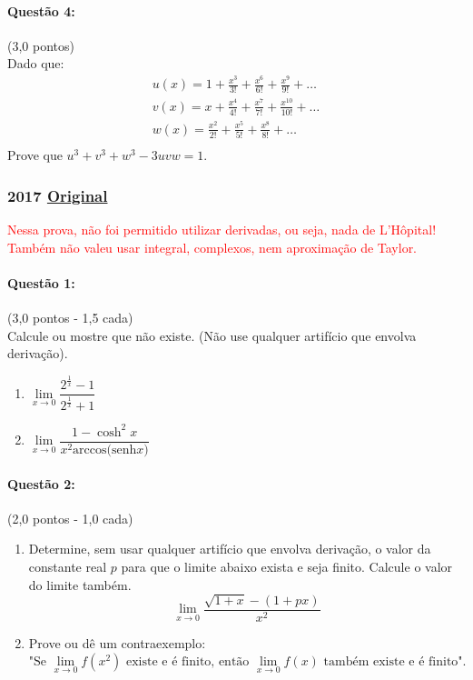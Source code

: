 \documentclass[12pt,a4paper]{article}
\newcommand{\original}[1]{\tiny \href{#1}{Original} \normalsize}
\begin{document}
\newpage

\paragraph{Questão 4:} (3,0 pontos) \\
Dado que:
\begin{align*}
u(x) = 1 + \frac{x^3}{3!} + \frac{x^6}{6!} + \frac{x^9}{9!} + \dots  \\
v(x) = x + \frac{x^4}{4!} + \frac{x^7}{7!} + \frac{x^{10}}{10!} + \dots  \\
w(x) = \frac{x^2}{2!} + \frac{x^5}{5!} + \frac{x^8}{8!} + \dots  \\
\end{align*}
Prove que $ u^3 + v^3 + w^3 - 3uvw = 1$. 

\newpage


\subsubsection{2017 \original{https://drive.google.com/file/d/1IsTA8j9YEY4dMirQQ2oATMbmVwdLysBI/view?usp=sharing}}

\textcolor{red}{Nessa prova, não foi permitido utilizar derivadas, ou seja, nada de L'Hôpital! Também não valeu usar integral, complexos, nem aproximação de Taylor.}

\paragraph{Questão 1: }(3,0 pontos - 1,5 cada) \\
Calcule ou mostre que não existe. (Não use qualquer artifício que envolva derivação).

\begin{enumerate}[label=(\alph*)]

\item $\lim\limits_{x\to 0} \dfrac{2^{\frac{1}{x}}-1}
{2^{\frac{1}{x}}+1}$

\item $\lim\limits_{x \to 0} \dfrac{1-\cosh^2 x}{x^2\mathrm{arccos(senh}x)}$

\end{enumerate}

\paragraph{Questão 2: }(2,0 pontos - 1,0 cada)
\begin{enumerate}[label=(\alph*)]
\item Determine, sem usar qualquer artifício que envolva derivação, o valor da constante real $p$ para que o limite abaixo exista e seja finito. Calcule o valor do limite também.
$$\lim\limits_{x\to 0} \dfrac{\sqrt{1+x} - (1+px)}{x^2}$$

\item Prove ou dê um contraexemplo:
$$\text{"Se }\lim\limits_{x\to 0} f(x^2) \text{ existe e é finito, então }\lim\limits_{x\to 0}f(x) \text{ também existe e é finito".}$$

\end{enumerate}
\end{document}
